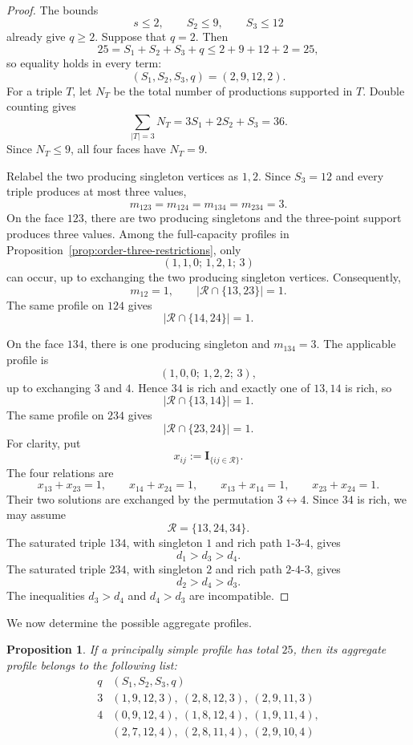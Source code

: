 \documentclass[11pt,a4paper]{article}
\newtheorem{proposition}[theorem]{Proposition}
\theoremstyle{definition}
\newcommand{\indic}{\mathbf I}
\begin{document}
\begin{proof}
The bounds
$$
s\leq2,\qquad S_2\leq9,\qquad S_3\leq12
$$
already give $q\geq2$. Suppose that $q=2$. Then
$$
25
=
S_1+S_2+S_3+q
\leq
2+9+12+2
=
25,
$$
so equality holds in every term:
$$
(S_1,S_2,S_3,q)=(2,9,12,2).
$$
For a triple $T$, let $N_T$ be the total number of productions supported
in $T$. Double counting gives
$$
\sum_{|T|=3}N_T=3S_1+2S_2+S_3=36.
$$
Since $N_T\leq9$, all four faces have $N_T=9$.

Relabel the two producing singleton vertices as $1,2$. Since
$S_3=12$ and every triple produces at most three values,
$$
m_{123}=m_{124}=m_{134}=m_{234}=3.
$$
On the face $123$, there are two producing singletons and the
three-point support produces three values. Among the full-capacity
profiles in Proposition~\ref{prop:order-three-restrictions}, only
$$
(1,1,0;\,1,2,1;\,3)
$$
can occur, up to exchanging the two producing singleton vertices.
Consequently,
$$
m_{12}=1,
\qquad
|\mathcal R\cap\{13,23\}|=1.
$$
The same profile on $124$ gives
$$
|\mathcal R\cap\{14,24\}|=1.
$$

On the face $134$, there is one producing singleton and
$m_{134}=3$. The applicable profile is
$$
(1,0,0;\,1,2,2;\,3),
$$
up to exchanging $3$ and $4$. Hence $34$ is rich and exactly one of
$13,14$ is rich, so
$$
|\mathcal R\cap\{13,14\}|=1.
$$
The same profile on $234$ gives
$$
|\mathcal R\cap\{23,24\}|=1.
$$
For clarity, put
$$
x_{ij}:=\indic_{\{ij\in\mathcal R\}}.
$$
The four relations are
$$
x_{13}+x_{23}=1,
\qquad
x_{14}+x_{24}=1,
\qquad
x_{13}+x_{14}=1,
\qquad
x_{23}+x_{24}=1.
$$
Their two solutions are exchanged by the permutation
$3\leftrightarrow4$. Since $34$ is rich, we may assume
$$
\mathcal R=\{13,24,34\}.
$$
The saturated triple $134$, with singleton $1$ and rich path
$1$-$3$-$4$, gives
$$
d_1>d_3>d_4.
$$
The saturated triple $234$, with singleton $2$ and rich path
$2$-$4$-$3$, gives
$$
d_2>d_4>d_3.
$$
The inequalities $d_3>d_4$ and $d_4>d_3$ are incompatible.
\end{proof}

We now determine the possible aggregate profiles.

\begin{proposition}
\label{prop:nine-aggregate-profiles}
If a principally simple profile has total $25$, then its aggregate
profile belongs to the following list:
$$
\begin{array}{c|c}
q& (S_1,S_2,S_3,q)\\
\hline
3&
(1,9,12,3),\
(2,8,12,3),\
(2,9,11,3)
\\
4&
(0,9,12,4),\
(1,8,12,4),\
(1,9,11,4),\\
&
(2,7,12,4),\
(2,8,11,4),\
(2,9,10,4)
\end{array}
$$
\end{proposition}
\end{document}
